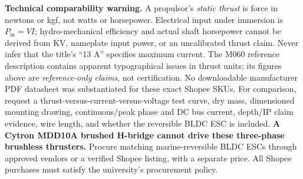\documentclass[10pt,a4paper]{article}
\begin{document}
\begin{landscape}
\textbf{Technical comparability warning.} A propulsor's \emph{static thrust} is force in newtons or kgf, not watts or horsepower. Electrical input under immersion is $P_{\mathrm{in}}=V I$; hydro-mechanical efficiency and actual shaft horsepower cannot be derived from KV, nameplate input power, or an uncalibrated thrust claim. Never infer that the title's ``13 A'' specifies maximum current. The M060 reference description contains apparent typographical issues in thrust units; its figures above are \emph{reference-only claims}, not certification. No downloadable manufacturer PDF datasheet was substantiated for these exact Shopee SKUs. For comparison, request a thrust-versus-current-versus-voltage test curve, dry mass, dimensioned mounting drawing, continuous/peak phase and DC bus current, depth/IP claim evidence, wire length, and whether the reversible BLDC ESC is included. \textbf{A Cytron MDD10A brushed H-bridge cannot drive these three-phase brushless thrusters.} Procure matching marine-reversible BLDC ESCs through approved vendors or a verified Shopee listing, with a separate price. All Shopee purchases must satisfy the university's procurement policy.
\end{landscape}
\end{document}
